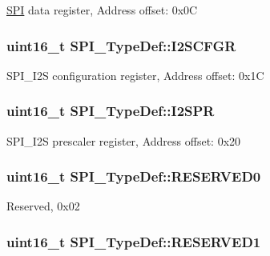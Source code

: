 \hyperlink{class_s_p_i}{S\-P\-I} data register, Address offset\-: 0x0\-C \hypertarget{struct_s_p_i___type_def_a20a4775ce461eec0d9a437bed464c0a5}{
\subsubsection[{I2\-S\-C\-F\-G\-R}]{ uint16\-\_\-t S\-P\-I\-\_\-\-Type\-Def\-::\-I2\-S\-C\-F\-G\-R}}\label{struct_s_p_i___type_def_a20a4775ce461eec0d9a437bed464c0a5}
S\-P\-I\-\_\-\-I2\-S configuration register, Address offset\-: 0x1\-C \hypertarget{struct_s_p_i___type_def_aecee11b0d2e534b5243e9db6a0e10026}{
\subsubsection[{I2\-S\-P\-R}]{ uint16\-\_\-t S\-P\-I\-\_\-\-Type\-Def\-::\-I2\-S\-P\-R}}\label{struct_s_p_i___type_def_aecee11b0d2e534b5243e9db6a0e10026}
S\-P\-I\-\_\-\-I2\-S prescaler register, Address offset\-: 0x20 \hypertarget{struct_s_p_i___type_def_a7f16c40933b8a713085436be72d30a46}{
\subsubsection[{R\-E\-S\-E\-R\-V\-E\-D0}]{\setlength{\rightskip}{0pt plus 5cm}uint16\-\_\-t S\-P\-I\-\_\-\-Type\-Def\-::\-R\-E\-S\-E\-R\-V\-E\-D0}}\label{struct_s_p_i___type_def_a7f16c40933b8a713085436be72d30a46}
Reserved, 0x02 \hypertarget{struct_s_p_i___type_def_a1b7a800c0f56532a431b19cf868e4102}{
\subsubsection[{R\-E\-S\-E\-R\-V\-E\-D1}]{\setlength{\rightskip}{0pt plus 5cm}uint16\-\_\-t S\-P\-I\-\_\-\-Type\-Def\-::\-R\-E\-S\-E\-R\-V\-E\-D1}}\label{struct_s_p_i___type_def_a1b7a800c0f56532a431b19cf868e4102}
